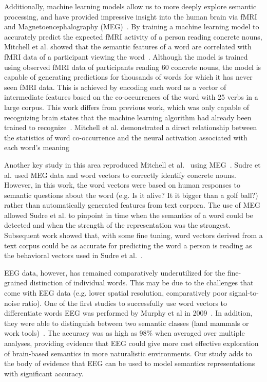 Additionally, machine learning models allow us to more deeply explore semantic processing, and have provided impressive insight into the human brain via fMRI and Magnetoencephalography (MEG)~\cite{Mitchell2008, Sudre2012}. By training a machine learning model to accurately predict the expected fMRI activity of a person reading concrete nouns, Mitchell et al. showed that the semantic features of a word are correlated with fMRI data of a participant viewing the word~\cite{Mitchell2008}. Although the model is trained using observed fMRI data of participants reading 60 concrete nouns, the model is capable of generating predictions for thousands of words for which it has never seen fMRI data. This is achieved by encoding each word as a vector of intermediate features based on the co-occurrences of the word with 25 verbs in a  large corpus.  This work differs from previous work, which was only capable of recognizing brain states that the machine learning algorithm had already been trained to recognize~\cite{kutas1980reading,kuperberg2007neural,Wang2002,Mitchell2002,Shinkareva2008,Gu2014}. Mitchell et al. demonstrated a direct relationship between the statistics of word co-occurrence and the neural activation associated with each word's meaning~\cite{Mitchell2008}

Another key study in this area reproduced Mitchell et al.~\cite{Mitchell2008} using MEG~\cite{Sudre2012}.  Sudre et al. used MEG data and word vectors to correctly identify concrete nouns.  However, in this work, the  word vectors were based on human responses to semantic questions about the word (e.g. Is it alive?  It it bigger than a golf ball?) rather than automatically generated features from text corpora. The use of MEG allowed Sudre et al. to pinpoint in time when the semantics of a word could be detected and when the strength of the representation was the strongest.  Subsequent work showed that, with some fine tuning, word vectors derived from a text corpus could be as accurate for predicting the word a person is reading as the behavioral vectors used in Sudre et al.~\cite{Murphy2012}.

EEG data, however, has remained comparatively underutilized for the fine-grained distinction of individual words. This may be due to the challenges that come with EEG data (e.g. lower spatial resolution, comparatively poor signal-to-noise ratio).  
One of the first studies to successfully use word vectors to differentiate words EEG was performed by Murphy et al in 2009~\cite{Murphy2009}.  In addition, they were able to distinguish between two semantic classes (land mammals or work tools)~\cite{Murphy2009,Murphy2011}. The accuracy was as high as 98\% when averaged over multiple analyses, providing evidence that EEG could give more cost effective exploration of brain-based semantics in more naturalistic environments.  Our study adds to the body of evidence that EEG can be used to model semantics representations with significant accuracy.

